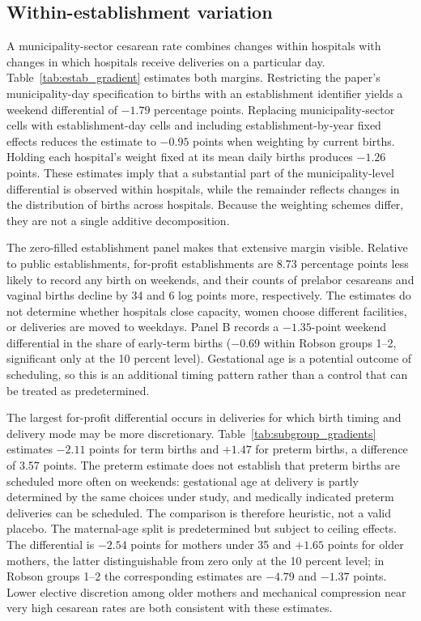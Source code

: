

\subsection{Within-establishment variation}

A municipality-sector cesarean rate combines changes within hospitals with changes
in which hospitals receive deliveries on a particular day.
Table~\ref{tab:estab_gradient} estimates both margins. Restricting the paper's
municipality-day specification to births with an establishment identifier yields
a weekend differential of $-1.79$ percentage points. Replacing municipality-sector
cells with establishment-day cells and including establishment-by-year fixed
effects reduces the estimate to $-0.95$ points when weighting by current births.
Holding each hospital's weight fixed at its mean daily births produces $-1.26$
points. These estimates imply that a substantial part of the municipality-level
differential is observed within hospitals, while the remainder reflects changes in
the distribution of births across hospitals. Because the weighting schemes differ,
they are not a single additive decomposition.

The zero-filled establishment panel makes that extensive margin visible. Relative
to public establishments, for-profit establishments are 8.73 percentage points less
likely to record any birth on weekends, and their counts of prelabor cesareans and
vaginal births decline by 34 and 6 log points more, respectively. The estimates do
not determine whether hospitals close capacity, women choose different facilities,
or deliveries are moved to weekdays. Panel B records a $-1.35$-point weekend
differential in the share of early-term births ($-0.69$ within Robson groups 1--2,
significant only at the 10 percent level). Gestational age is a potential outcome
of scheduling, so this is an additional timing pattern rather than a control that
can be treated as predetermined.



The largest for-profit differential occurs in deliveries for which birth timing
and delivery mode may be more discretionary. Table~\ref{tab:subgroup_gradients}
estimates $-2.11$ points for term births and $+1.47$ for preterm births, a
difference of 3.57 points. The preterm estimate does not establish that preterm
births are scheduled more often on weekends: gestational age at delivery is partly
determined by the same choices under study, and medically indicated preterm
deliveries can be scheduled. The comparison is therefore heuristic, not a valid
placebo. The maternal-age split is predetermined but subject to ceiling effects.
The differential is $-2.54$ points for mothers under 35 and $+1.65$ points for
older mothers, the latter distinguishable from zero only at the 10 percent level;
in Robson groups 1--2 the corresponding estimates are $-4.79$ and $-1.37$ points.
Lower elective discretion among older mothers and mechanical compression near very
high cesarean rates are both consistent with these estimates.


